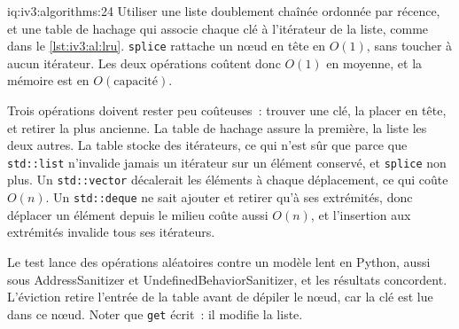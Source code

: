 \begin{solution}{iq:iv3:algorithms:24}
Utiliser une liste doublement chaînée ordonnée par récence, et une table de hachage qui associe chaque clé à l'itérateur de la liste, comme dans le \cref{lst:iv3:al:lru}. \texttt{splice} rattache un nœud en tête en $O(1)$, sans toucher à aucun itérateur. Les deux opérations coûtent donc $O(1)$ en moyenne, et la mémoire est en $O(\text{capacité})$.
\label{lst:iv3:al:lru}

Trois opérations doivent rester peu coûteuses~: trouver une clé, la placer en tête, et retirer la plus ancienne. La table de hachage assure la première, la liste les deux autres. La table stocke des itérateurs, ce qui n'est sûr que parce que \texttt{std::list} n'invalide jamais un itérateur sur un élément conservé, et \texttt{splice} non plus. Un \texttt{std::vector} décalerait les éléments à chaque déplacement, ce qui coûte $O(n)$. Un \texttt{std::deque} ne sait ajouter et retirer qu'à ses extrémités, donc déplacer un élément depuis le milieu coûte aussi $O(n)$, et l'insertion aux extrémités invalide tous ses itérateurs.

Le test lance des opérations aléatoires contre un modèle lent en Python, aussi sous AddressSanitizer et UndefinedBehaviorSanitizer, et les résultats concordent. L'éviction retire l'entrée de la table avant de dépiler le nœud, car la clé est lue dans ce nœud. Noter que \texttt{get} écrit~: il modifie la liste.

\end{solution}


